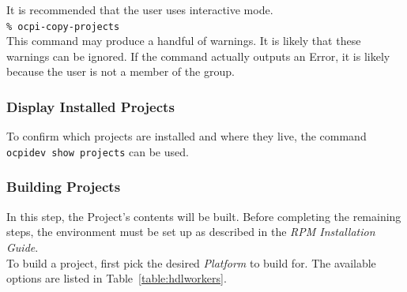 It is recommended that the user uses interactive mode. \\

\verb+% ocpi-copy-projects+ \\

This command may produce a handful of warnings. It is likely that these warnings can be ignored. If the command actually outputs an Error, it is likely because the user is not a member of the  group.


\subsubsection{Display Installed Projects}
To confirm which projects are installed and where they live, the command \texttt{ocpidev show projects} can be used.
\subsubsection{Building Projects}
\label{subsubsec:buildworkers}
In this step, the Project's contents will be built. Before completing the remaining steps, the environment must be set up as described in the \textit{RPM Installation Guide}.\\

To build a project, first pick the desired \textit{Platform} to build for. The available options are listed in Table~\ref{table:hdlworkers}.

